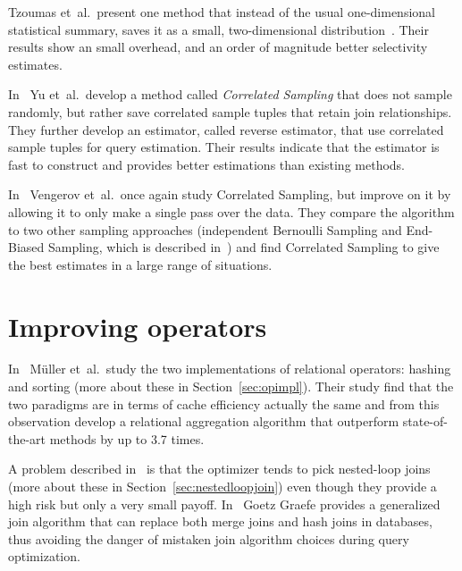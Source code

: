 Tzoumas et\ al.\ present one method that instead of the usual one-dimensional
statistical summary, saves it as a small, two-dimensional
distribution~\cite{tzoumas_2011_lightweight_lgmfsewia}. Their results show an
small overhead, and an order of magnitude better selectivity estimates.

In~\cite{yu_2013_cs2_candsfqea} Yu et\ al.\ develop a  method called
\textit{Correlated Sampling} that does not sample randomly, but rather save
correlated sample tuples that retain join relationships. They further develop an
estimator, called reverse estimator, that use correlated sample tuples for query
estimation. Their results indicate that the estimator is fast to construct and
provides better estimations than existing methods.

In~\cite{vengerov_2015_join_jsestfc} Vengerov et\ al.\ once again study
Correlated Sampling, but improve on it by allowing it to only make a single pass
over the data. They compare the algorithm to two other sampling approaches
(independent Bernoulli Sampling and End-Biased Sampling, which is described
in~\cite{estan_2006_end_esfjce}) and find Correlated Sampling to give the best
estimates in a large range of situations.

\section{Improving operators}
In~\cite{muller_2015_cache_cahis} Müller  et\ al.\ study the two implementations
of relational operators: hashing and sorting (more about these in
Section~\ref{sec:opimpl}). Their study find that the two paradigms are in terms
of cache efficiency actually the same and from this observation develop a
relational aggregation algorithm that outperform state-of-the-art methods by up
to 3.7 times.

A problem described in~\cite{leis_2015_how_hgaqor} is that the optimizer tends
to pick nested-loop joins (more about these in Section~\ref{sec:nestedloopjoin})
even though they provide a high risk but only a very small payoff.
In~\cite{graefe_2011_generalized_agja} Goetz Graefe provides a generalized join
algorithm that can replace both merge joins and hash joins in databases, thus
avoiding the danger of mistaken join algorithm choices during query
optimization.

